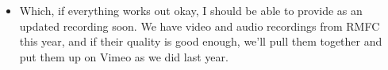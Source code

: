 \begin{itemize}
\tightlist
\item
  Which, if everything works out okay, I should be able to provide as an updated recording soon. We have video and audio recordings from RMFC this year, and if their quality is good enough, we'll pull them together and put them up on Vimeo as we did last year.
\end{itemize}
